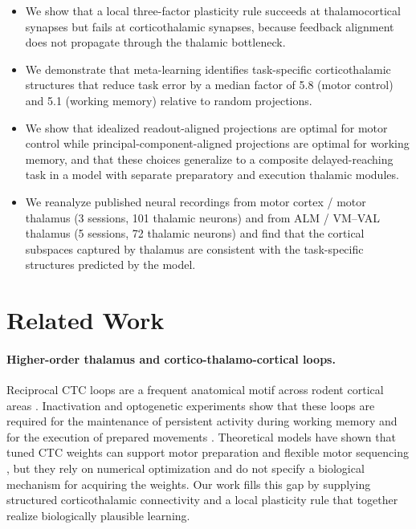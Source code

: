 \begin{itemize}
  \item We show that a local three-factor plasticity rule succeeds at
  thalamocortical synapses but fails at corticothalamic synapses, because
  feedback alignment does not propagate through the thalamic bottleneck.
  \item We demonstrate that meta-learning identifies task-specific
  corticothalamic structures that reduce task error by a median factor of
  5.8 (motor control) and 5.1 (working memory) relative to random
  projections.
  \item We show that idealized readout-aligned projections are optimal for
  motor control while principal-component-aligned projections are optimal
  for working memory, and that these choices generalize to a composite
  delayed-reaching task in a model with separate preparatory and
  execution thalamic modules.
  \item We reanalyze published neural recordings from motor cortex /
  motor thalamus (3 sessions, 101 thalamic neurons) and from ALM /
  VM--VAL thalamus (5 sessions, 72 thalamic neurons) and find that the
  cortical subspaces captured by thalamus are consistent with the
  task-specific structures predicted by the model.
\end{itemize}

\section{Related Work}

\paragraph{Higher-order thalamus and cortico-thalamo-cortical loops.}
Reciprocal CTC loops are a frequent anatomical motif across rodent
cortical areas \cite{yamawaki2015synaptic, economo2018distinct,
collins2018reciprocal, guo2018anterolateral, halassa2019thalamocortical}.
Inactivation and optogenetic experiments show that these loops are
required for the maintenance of persistent activity during working
memory and for the execution of prepared movements
\cite{guo2017maintenance, bolkan2017thalamic, schmitt2017thalamic,
sauerbrei2020cortical, rikhye2018thalamic, alcaraz2018thalamocortical}.
Theoretical models have shown that tuned CTC weights can support motor
preparation and flexible motor sequencing
\cite{kao2021optimal, logiaco2021thalamic}, but they rely on numerical
optimization and do not specify a biological mechanism for acquiring the
weights. Our work fills this gap by supplying structured corticothalamic
connectivity and a local plasticity rule that together realize
biologically plausible learning.

